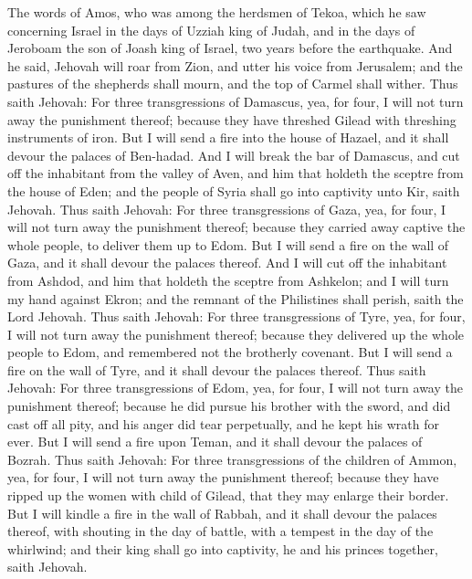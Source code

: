 


The words of Amos, who was among the herdsmen of Tekoa, which he saw concerning Israel in the days of Uzziah king of Judah, and in the days of Jeroboam the son of Joash king of Israel, two years before the earthquake.  And he said, Jehovah will roar from Zion, and utter his voice from Jerusalem; and the pastures of the shepherds shall mourn, and the top of Carmel shall wither.  Thus saith Jehovah: For three transgressions of Damascus, yea, for four, I will not turn away the punishment thereof; because they have threshed Gilead with threshing instruments of iron. But I will send a fire into the house of Hazael, and it shall devour the palaces of Ben-hadad. And I will break the bar of Damascus, and cut off the inhabitant from the valley of Aven, and him that holdeth the sceptre from the house of Eden; and the people of Syria shall go into captivity unto Kir, saith Jehovah.  Thus saith Jehovah: For three transgressions of Gaza, yea, for four, I will not turn away the punishment thereof; because they carried away captive the whole people, to deliver them up to Edom. But I will send a fire on the wall of Gaza, and it shall devour the palaces thereof. And I will cut off the inhabitant from Ashdod, and him that holdeth the sceptre from Ashkelon; and I will turn my hand against Ekron; and the remnant of the Philistines shall perish, saith the Lord Jehovah.  Thus saith Jehovah: For three transgressions of Tyre, yea, for four, I will not turn away the punishment thereof; because they delivered up the whole people to Edom, and remembered not the brotherly covenant. But I will send a fire on the wall of Tyre, and it shall devour the palaces thereof.  Thus saith Jehovah: For three transgressions of Edom, yea, for four, I will not turn away the punishment thereof; because he did pursue his brother with the sword, and did cast off all pity, and his anger did tear perpetually, and he kept his wrath for ever. But I will send a fire upon Teman, and it shall devour the palaces of Bozrah.  Thus saith Jehovah: For three transgressions of the children of Ammon, yea, for four, I will not turn away the punishment thereof; because they have ripped up the women with child of Gilead, that they may enlarge their border. But I will kindle a fire in the wall of Rabbah, and it shall devour the palaces thereof, with shouting in the day of battle, with a tempest in the day of the whirlwind; and their king shall go into captivity, he and his princes together, saith Jehovah. 

